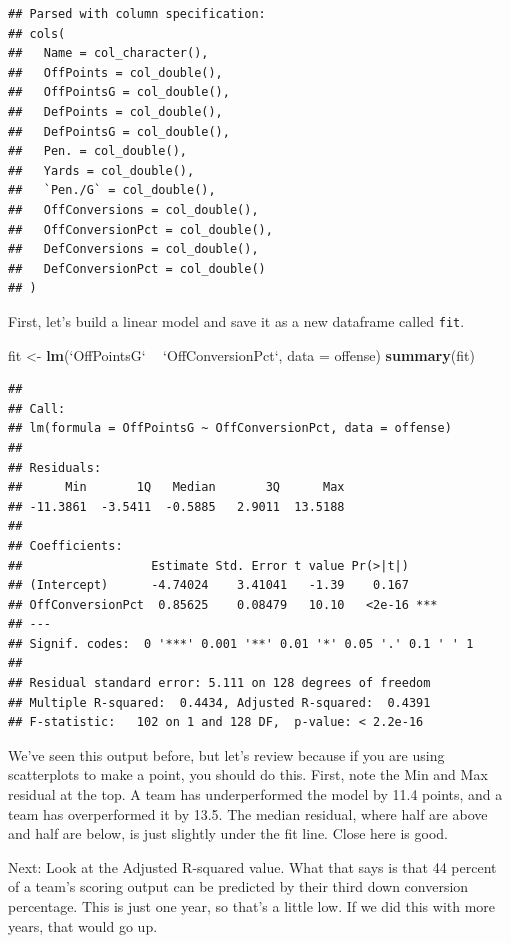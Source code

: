 \documentclass[]{book}
\newenvironment{Shaded}{\begin{snugshade}}{\end{snugshade}}
\newcommand{\KeywordTok}[1]{\textcolor[rgb]{0.13,0.29,0.53}{\textbf{#1}}}
\newcommand{\DataTypeTok}[1]{\textcolor[rgb]{0.13,0.29,0.53}{#1}}
\newcommand{\StringTok}[1]{\textcolor[rgb]{0.31,0.60,0.02}{#1}}
\newcommand{\OperatorTok}[1]{\textcolor[rgb]{0.81,0.36,0.00}{\textbf{#1}}}
\newcommand{\NormalTok}[1]{#1}
\begin{document}
\begin{verbatim}
## Parsed with column specification:
## cols(
##   Name = col_character(),
##   OffPoints = col_double(),
##   OffPointsG = col_double(),
##   DefPoints = col_double(),
##   DefPointsG = col_double(),
##   Pen. = col_double(),
##   Yards = col_double(),
##   `Pen./G` = col_double(),
##   OffConversions = col_double(),
##   OffConversionPct = col_double(),
##   DefConversions = col_double(),
##   DefConversionPct = col_double()
## )
\end{verbatim}

First, let's build a linear model and save it as a new dataframe called
\texttt{fit}.

\begin{Shaded}
\begin{Highlighting}[]
\NormalTok{fit <-}\StringTok{ }\KeywordTok{lm}\NormalTok{(}\StringTok{`}\DataTypeTok{OffPointsG}\StringTok{`} \OperatorTok{~}\StringTok{ `}\DataTypeTok{OffConversionPct}\StringTok{`}\NormalTok{, }\DataTypeTok{data =}\NormalTok{ offense)}
\KeywordTok{summary}\NormalTok{(fit)}
\end{Highlighting}
\end{Shaded}

\begin{verbatim}
## 
## Call:
## lm(formula = OffPointsG ~ OffConversionPct, data = offense)
## 
## Residuals:
##      Min       1Q   Median       3Q      Max 
## -11.3861  -3.5411  -0.5885   2.9011  13.5188 
## 
## Coefficients:
##                  Estimate Std. Error t value Pr(>|t|)    
## (Intercept)      -4.74024    3.41041   -1.39    0.167    
## OffConversionPct  0.85625    0.08479   10.10   <2e-16 ***
## ---
## Signif. codes:  0 '***' 0.001 '**' 0.01 '*' 0.05 '.' 0.1 ' ' 1
## 
## Residual standard error: 5.111 on 128 degrees of freedom
## Multiple R-squared:  0.4434, Adjusted R-squared:  0.4391 
## F-statistic:   102 on 1 and 128 DF,  p-value: < 2.2e-16
\end{verbatim}

We've seen this output before, but let's review because if you are using
scatterplots to make a point, you should do this. First, note the Min
and Max residual at the top. A team has underperformed the model by 11.4
points, and a team has overperformed it by 13.5. The median residual,
where half are above and half are below, is just slightly under the fit
line. Close here is good.

Next: Look at the Adjusted R-squared value. What that says is that 44
percent of a team's scoring output can be predicted by their third down
conversion percentage. This is just one year, so that's a little low. If
we did this with more years, that would go up.
\end{document}
